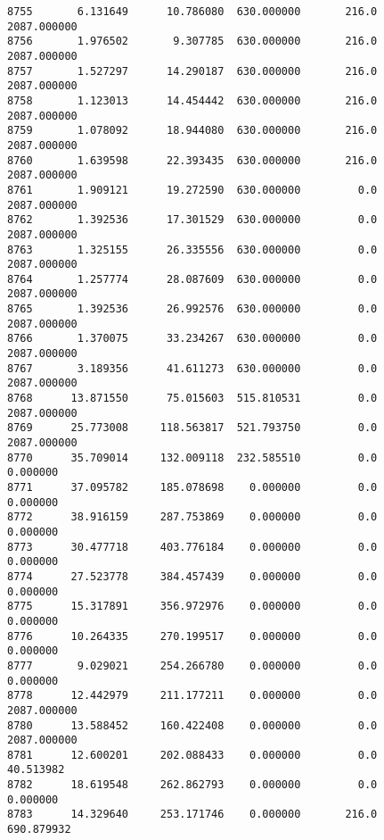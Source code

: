 \documentclass[11pt]{article}
\begin{document}
\begin{Verbatim}[commandchars=\\\{\}]
8755       6.131649      10.786080  630.000000       216.0  2087.000000   
8756       1.976502       9.307785  630.000000       216.0  2087.000000   
8757       1.527297      14.290187  630.000000       216.0  2087.000000   
8758       1.123013      14.454442  630.000000       216.0  2087.000000   
8759       1.078092      18.944080  630.000000       216.0  2087.000000   
8760       1.639598      22.393435  630.000000       216.0  2087.000000   
8761       1.909121      19.272590  630.000000         0.0  2087.000000   
8762       1.392536      17.301529  630.000000         0.0  2087.000000   
8763       1.325155      26.335556  630.000000         0.0  2087.000000   
8764       1.257774      28.087609  630.000000         0.0  2087.000000   
8765       1.392536      26.992576  630.000000         0.0  2087.000000   
8766       1.370075      33.234267  630.000000         0.0  2087.000000   
8767       3.189356      41.611273  630.000000         0.0  2087.000000   
8768      13.871550      75.015603  515.810531         0.0  2087.000000   
8769      25.773008     118.563817  521.793750         0.0  2087.000000   
8770      35.709014     132.009118  232.585510         0.0     0.000000   
8771      37.095782     185.078698    0.000000         0.0     0.000000   
8772      38.916159     287.753869    0.000000         0.0     0.000000   
8773      30.477718     403.776184    0.000000         0.0     0.000000   
8774      27.523778     384.457439    0.000000         0.0     0.000000   
8775      15.317891     356.972976    0.000000         0.0     0.000000   
8776      10.264335     270.199517    0.000000         0.0     0.000000   
8777       9.029021     254.266780    0.000000         0.0     0.000000   
8778      12.442979     211.177211    0.000000         0.0  2087.000000   
8780      13.588452     160.422408    0.000000         0.0  2087.000000   
8781      12.600201     202.088433    0.000000         0.0    40.513982   
8782      18.619548     262.862793    0.000000         0.0     0.000000   
8783      14.329640     253.171746    0.000000       216.0   690.879932   


\end{Verbatim}
\end{document}
